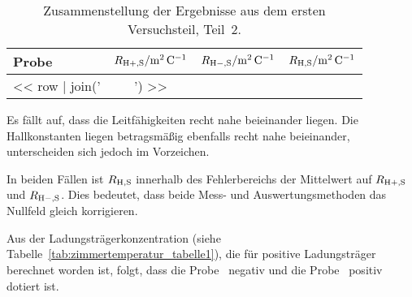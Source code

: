 \begin{table}[htbp]
    \centering
    \begin{tabular}{lSSS}
        Probe &
        {$R_{\text H+, \text S} / \si{\meter\squared\per\coulomb}$} &
        {$R_{\text H-, \text S} / \si{\meter\squared\per\coulomb}$} &
        {$R_{\text H, \text S} / \si{\meter\squared\per\coulomb}$} \\
        \midrule
        << row | join(' & ') >> \\
    \end{tabular}
    \caption{%
        Zusammenstellung der Ergebnisse aus dem ersten Versuchsteil, Teil~2.
    }
    \label{tab:zimmertemperatur_tabelle2}
\end{table}

Es fällt auf, dass die Leitfähigkeiten recht nahe beieinander
liegen. Die Hallkonstanten liegen betragsmäßig ebenfalls recht nahe
beieinander, unterscheiden sich jedoch im Vorzeichen.

In beiden Fällen ist $R_{\text H, \text S}$ innerhalb des Fehlerbereichs der
Mittelwert auf $R_{\text H+, \text S}$ und $R_{\text H-, \text S}$. Dies
bedeutet, dass beide Mess- und Auswertungsmethoden das Nullfeld gleich
korrigieren.

Aus der Ladungsträgerkonzentration (siehe
Tabelle~\ref{tab:zimmertemperatur_tabelle1}), die für positive Ladungsträger
berechnet worden ist, folgt, dass die Probe~\probeA{} negativ und die
Probe~\probeB{} positiv dotiert ist.

\printbibliography



